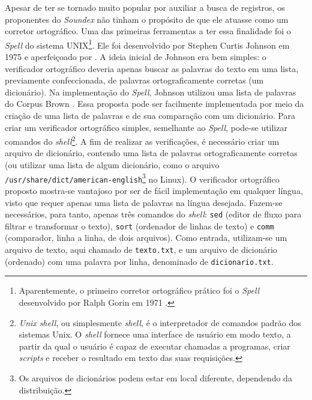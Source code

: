 \documentclass{textolivre}
\begin{document}
Apesar de ter se tornado muito popular
por auxiliar a busca de registros, os proponentes do \textit{Soundex} não
tinham o propósito de que ele atuasse como um
corretor ortográfico. 
Uma das primeiras ferramentas a ter essa finalidade foi o \textit{Spell} do sistema UNIX\footnote{
Aparentemente, o primeiro corretor ortográfico prático foi o \textit{Spell} desenvolvido
por Ralph Gorin em 1971 \cite{gorin1974,peterson80}.
}. 
Ele foi desenvolvido por Stephen Curtis Johnson em 1975 e aperfeiçoado por \textcite{mcilroy1982}.  
A ideia inicial de Johnson era bem simples: o verificador ortográfico
deveria apenas buscar as palavras do texto 
em uma lista, previamente confeccionada, de palavras ortograficamente corretas (um dicionário).
Na implementação do \textit{Spell}, Johnson utilizou uma lista de palavras do Corpus Brown \cite{kucera}.
Essa proposta pode ser facilmente implementada por meio da criação de uma lista de palavras e de sua
comparação com um dicionário. 
Para criar um verificador ortográfico simples, semelhante ao \textit{Spell}, 
pode-se utilizar comandos do \textit{shell}\footnote{
\textit{Unix shell}, ou simplesmente \textit{shell}, é o interpretador de comandos padrão dos sistemas Unix.
O \textit{shell} fornece uma interface de usuário em modo texto, a partir da qual o usuário é capaz de
executar chamadas a programas, criar \textit{scripts} e receber o resultado em texto das suas requisições.
}. 
A fim de realizar as verificações, é necessário criar um arquivo de dicionário, contendo uma lista de palavras ortograficamente corretas 
(ou utilizar uma lista de algum dicionário, como o arquivo \texttt{/usr/share/dict/american-english}\footnote{Os arquivos de dicionários 
podem estar em local diferente, dependendo da distribuição.} no Linux).
O verificador ortográfico proposto mostra-se vantajoso por ser de fácil implementação em qualquer língua, 
visto que requer apenas uma lista de palavras na língua desejada.  
Fazem-se necessários, para tanto, apenas três
comandos do \textit{shell}: \texttt{sed} (editor de fluxo para filtrar e transformar o texto), 
\texttt{sort} (ordenador de linhas de texto) e \texttt{comm} (comparador, linha a linha, de dois arquivos).
Como entrada, utilizam-se um arquivo de texto, aqui chamado de \texttt{texto.txt}, e um
arquivo de dicionário (ordenado) com uma palavra por linha, denominado de 
\texttt{dicionario.txt}.
\end{document}

